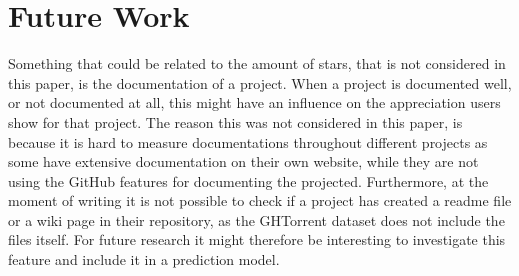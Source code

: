 \section{Future Work}
Something that could be related to the amount of stars, that is not considered in this paper, is the documentation of a project.
When a project is documented well, or not documented at all, this might have an influence on the appreciation users show for that project.
The reason this was not considered in this paper, is because it is hard to measure documentations throughout different projects as some have extensive documentation on their own website, while they are not using the GitHub features for documenting the projected.
Furthermore, at the moment of writing it is not possible to check if a project has created a readme file or a wiki page in their repository, as the GHTorrent dataset does not include the files itself. For future research it might therefore be interesting to investigate this feature and include it in a prediction model.

